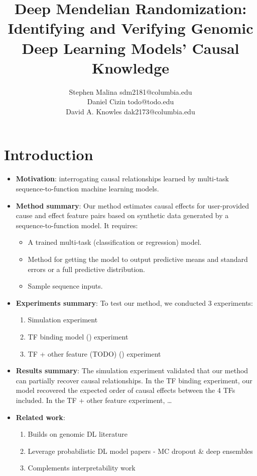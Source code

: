 \documentclass[twoside,11pt]{article}
\begin{document}
\title{Deep Mendelian Randomization: Identifying and Verifying Genomic Deep Learning Models' Causal Knowledge}

\author{\name Stephen Malina \email sdm2181@columbia.edu \\
       \AND
	\name Daniel Cizin \email todo@todo.edu \\
       \AND
       \name David A. Knowles \email dak2173@columbia.edu}
       


\maketitle

\section{Introduction}
\begin{itemize}
	\item \textbf{Motivation}: interrogating causal relationships learned by multi-task sequence-to-function machine learning models.
	\item \textbf{Method summary}: Our method estimates causal effects for user-provided cause and effect feature pairs based on synthetic data generated by a sequence-to-function model. It requires:
		\begin{itemize}
			\item A trained multi-task (classification or regression) model.
			\item Method for getting the model to output predictive means and standard errors or a full predictive distribution.
			\item Sample sequence inputs.
		\end{itemize}
	\item \textbf{Experiments summary}: To test our method, we conducted 3 experiments:
		\begin{enumerate}
			\item Simulation experiment
			\item TF binding model (\cite{avsec2020base}) experiment
			\item TF + other feature (TODO) (\cite{zhou2015predicting}) experiment
		\end{enumerate}
	\item \textbf{Results summary}: The simulation experiment validated that our method can partially recover causal relationships. In the TF binding experiment, our model recovered the expected order of causal effects between the 4 TFs included. In the TF + other feature experiment, \dots
	\item \textbf{Related work}: 
		\begin{enumerate}
			\item Builds on genomic DL literature
			\item Leverage probabilistic DL model papers - MC dropout \& deep ensembles
			\item Complements interpretability work
		\end{enumerate} 
\end{itemize}
\end{document}

